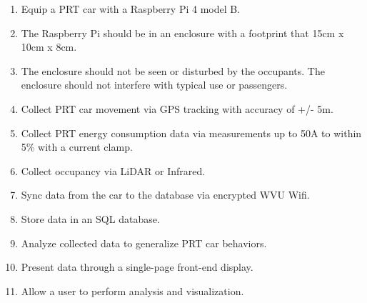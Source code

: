 \begin{enumerate}
    \item Equip a PRT car with a Raspberry Pi 4 model B. 
    \item The Raspberry Pi should be in an enclosure with a footprint that 15cm x 10cm x 8cm.
    \item The enclosure should not be seen or disturbed by the occupants. The enclosure should not interfere with typical use or passengers.
    \item Collect PRT car movement via GPS tracking with accuracy of +/- 5m.
    \item Collect PRT energy consumption data via measurements up to 50A to within 5\% with a current clamp.
    \item Collect occupancy via LiDAR or Infrared. 
    \item Sync data from the car to the database via encrypted WVU Wifi. 
    \item Store data in an SQL database.
    \item Analyze collected data to generalize PRT car behaviors. 
    \item Present data through a single-page front-end display.
    \item Allow a user to perform analysis and visualization.
\end{enumerate}